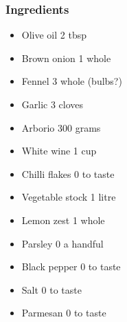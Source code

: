 \documentclass[]{article}
\begin{document}
\subsubsection*{\Large Ingredients}
\begin{multicols}{2}
\begin{itemize}
 \item Olive oil \hfill 2 tbsp
 \item Brown onion \hfill 1 whole
 \item Fennel \hfill 3 whole (bulbs?)
 \item Garlic \hfill 3 cloves
 \item Arborio \hfill 300 grams
 \item White wine \hfill 1 cup
 \item Chilli flakes \hfill 0 to taste
 \item Vegetable stock \hfill 1 litre
 \item Lemon zest \hfill 1 whole
 \item Parsley \hfill 0 a handful
 \item Black pepper \hfill 0 to taste
 \item Salt \hfill 0 to taste
 \item Parmesan \hfill 0 to taste
\end{itemize}
\end{multicols}
\end{document}
